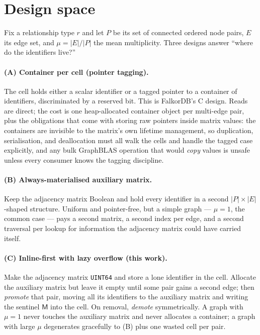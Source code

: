 \documentclass[11pt,a4paper]{article}
\theoremstyle{plain}
\theoremstyle{definition}
\theoremstyle{remark}
\newcommand{\M}{\mathsf{M}}
\begin{document}
\section{Design space}
\label{sec:designspace}

Fix a relationship type $r$ and let $P$ be its set of connected ordered node
pairs, $E$ its edge set, and $\mu = |E|/|P|$ the mean multiplicity. Three
designs answer ``where do the identifiers live?''

\paragraph{(A) Container per cell (pointer tagging).}
The cell holds either a scalar identifier or a tagged pointer to a container
of identifiers, discriminated by a reserved bit. This is FalkorDB's C design.
Reads are direct; the cost is one heap-allocated container object per
multi-edge pair, plus the obligations that come with storing raw pointers
inside matrix values: the containers are invisible to the matrix's own
lifetime management, so duplication, serialisation, and deallocation must all
walk the cells and handle the tagged case explicitly, and any bulk GraphBLAS
operation that would \emph{copy} values is unsafe unless every consumer knows
the tagging discipline.

\paragraph{(B) Always-materialised auxiliary matrix.}
Keep the adjacency matrix Boolean and hold every identifier in a second
$|P| \times |E|$-shaped structure. Uniform and pointer-free, but a simple
graph --- $\mu = 1$, the common case --- pays a second matrix, a second index
per edge, and a second traversal per lookup for information the adjacency
matrix could have carried itself.

\paragraph{(C) Inline-first with lazy overflow (this work).}
Make the adjacency matrix \texttt{UINT64} and store a lone identifier in the
cell. Allocate the auxiliary matrix but leave it empty until some pair gains a
second edge; then \emph{promote} that pair, moving all its identifiers to the
auxiliary matrix and writing the sentinel $\M$ into the cell. On removal,
\emph{demote} symmetrically. A graph with $\mu = 1$ never touches the
auxiliary matrix and never allocates a container; a graph with large $\mu$
degenerates gracefully to (B) plus one wasted cell per pair.
\end{document}
